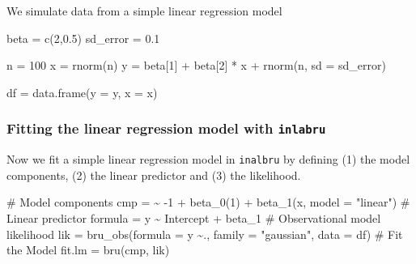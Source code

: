 \documentclass[
  letterpaper,
  DIV=11,
  numbers=noendperiod]{scrartcl}
\newenvironment{Shaded}{\begin{snugshade}}{\end{snugshade}}
\newcommand{\AttributeTok}[1]{\textcolor[rgb]{0.40,0.45,0.13}{#1}}
\newcommand{\CommentTok}[1]{\textcolor[rgb]{0.37,0.37,0.37}{#1}}
\newcommand{\DecValTok}[1]{\textcolor[rgb]{0.68,0.00,0.00}{#1}}
\newcommand{\ErrorTok}[1]{\textcolor[rgb]{0.68,0.00,0.00}{#1}}
\newcommand{\FloatTok}[1]{\textcolor[rgb]{0.68,0.00,0.00}{#1}}
\newcommand{\FunctionTok}[1]{\textcolor[rgb]{0.28,0.35,0.67}{#1}}
\newcommand{\NormalTok}[1]{\textcolor[rgb]{0.00,0.23,0.31}{#1}}
\newcommand{\OtherTok}[1]{\textcolor[rgb]{0.00,0.23,0.31}{#1}}
\newcommand{\SpecialCharTok}[1]{\textcolor[rgb]{0.37,0.37,0.37}{#1}}
\newcommand{\StringTok}[1]{\textcolor[rgb]{0.13,0.47,0.30}{#1}}
\begin{document}
We simulate data from a simple linear regression model

\begin{Shaded}
\begin{Highlighting}[]
\NormalTok{beta }\OtherTok{=} \FunctionTok{c}\NormalTok{(}\DecValTok{2}\NormalTok{,}\FloatTok{0.5}\NormalTok{)}
\NormalTok{sd\_error }\OtherTok{=} \FloatTok{0.1}

\NormalTok{n }\OtherTok{=} \DecValTok{100}
\NormalTok{x }\OtherTok{=} \FunctionTok{rnorm}\NormalTok{(n)}
\NormalTok{y }\OtherTok{=}\NormalTok{ beta[}\DecValTok{1}\NormalTok{] }\SpecialCharTok{+}\NormalTok{ beta[}\DecValTok{2}\NormalTok{] }\SpecialCharTok{*}\NormalTok{ x }\SpecialCharTok{+} \FunctionTok{rnorm}\NormalTok{(n, }\AttributeTok{sd =}\NormalTok{ sd\_error)}

\NormalTok{df }\OtherTok{=} \FunctionTok{data.frame}\NormalTok{(}\AttributeTok{y =}\NormalTok{ y, }\AttributeTok{x =}\NormalTok{ x)  }
\end{Highlighting}
\end{Shaded}

\subsubsection{\texorpdfstring{Fitting the linear regression model with
\texttt{inlabru}}{Fitting the linear regression model with inlabru}}\label{fitting-the-linear-regression-model-with-inlabru}

Now we fit a simple linear regression model in \texttt{inalbru} by
defining (1) the model components, (2) the linear predictor and (3) the
likelihood.

\begin{Shaded}
\begin{Highlighting}[]
\CommentTok{\# Model components}
\NormalTok{cmp }\OtherTok{=}  \ErrorTok{\textasciitilde{}} \SpecialCharTok{{-}}\DecValTok{1} \SpecialCharTok{+} \FunctionTok{beta\_0}\NormalTok{(}\DecValTok{1}\NormalTok{) }\SpecialCharTok{+} \FunctionTok{beta\_1}\NormalTok{(x, }\AttributeTok{model =} \StringTok{"linear"}\NormalTok{)}
\CommentTok{\# Linear predictor}
\NormalTok{formula }\OtherTok{=}\NormalTok{ y }\SpecialCharTok{\textasciitilde{}}\NormalTok{ Intercept }\SpecialCharTok{+}\NormalTok{ beta\_1}
\CommentTok{\# Observational model likelihood}
\NormalTok{lik }\OtherTok{=}  \FunctionTok{bru\_obs}\NormalTok{(}\AttributeTok{formula =}\NormalTok{ y }\SpecialCharTok{\textasciitilde{}}\NormalTok{.,}
            \AttributeTok{family =} \StringTok{"gaussian"}\NormalTok{,}
            \AttributeTok{data =}\NormalTok{ df)}
\CommentTok{\# Fit the Model}
\NormalTok{fit.lm }\OtherTok{=} \FunctionTok{bru}\NormalTok{(cmp, lik)}
\end{Highlighting}
\end{Shaded}
\end{document}
